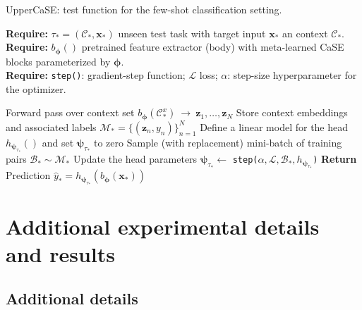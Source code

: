 \documentclass{article}
\begin{document}
\begin{algorithm}[H]
\small
\caption{UpperCaSE: test function for the few-shot classification setting.}
\label{alg:test_overview}
\textbf{Require:}  $\tau_{\ast} = ( \mathcal{C}_{\ast}, \mathbf{x}_{\ast} )$ unseen test task with target input $\mathbf{x}_{\ast}$ an context $\mathcal{C}_{\ast}$. \\
\textbf{Require:} $b_{\boldsymbol{\phi}}()$ pretrained feature extractor (body) with meta-learned CaSE blocks parameterized by $\boldsymbol{\phi}$. \\
\textbf{Require:} \texttt{step()}: gradient-step function; $\mathcal{L}$ loss;  $\alpha$: step-size hyperparameter for the optimizer.
\begin{algorithmic}[1]
\vspace{0.1cm}
    \State Forward pass over context set $b_{\boldsymbol{\phi}}(\mathcal{C}^x_{\ast}) \ \rightarrow \ \mathbf{z}_1, \dots, \mathbf{z}_N$ 
    \State Store context embeddings and associated labels $\mathcal{M}_{\ast} = \{(\mathbf{z}_n, y_n)\}_{n=1}^{N}$ 
    \State Define a linear model for the head $h_{\boldsymbol{\psi}_{\tau_{\ast}}}()$ and set $\boldsymbol{\psi}_{\tau_{\ast}}$ to zero
     
        \State Sample (with replacement) mini-batch of training pairs $\mathcal{B}_{\ast} \sim \mathcal{M}_{\ast}$
        \State Update the head parameters $\boldsymbol{\psi}_{\tau_{\ast}} \leftarrow$ \texttt{step($\alpha, \mathcal{L}, \mathcal{B}_{\ast}, h_{\boldsymbol{\psi}_{\tau_{\ast}}}$)}
    \EndFor
    \State \textbf{Return} Prediction $\hat{y}_{\ast} = h_{\boldsymbol{\psi}_{\tau_{\ast}}}(b_{\boldsymbol{\phi}}(\mathbf{x}_{\ast}))$ 
\vspace{0.1cm}
\Statex
\end{algorithmic}
  \vspace{-0.4cm}\end{algorithm}

\section{Additional experimental details and results} \label{appendix:sec_additional_experimental_results}

\subsection{Additional details} \label{appendix:ssec_experimental_details}
\end{document}
